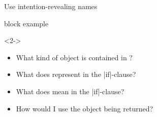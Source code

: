 \begin{frame}[fragile]{Use intention-revealing names}
\begin{varblock}{block example}{}
    \end{varblock}
    \begin{uncoverenv}<2->
        \begin{itemize}
            \setlength{\itemsep}{0mm}
            \item What kind of object is contained in ?
            \item What does  represent in the \CPP|if|-clause?
            \item What does  mean in the \CPP|if|-clause?
            \item How would I use the object being returned?
        \end{itemize}
    \end{uncoverenv}
\end{frame}

